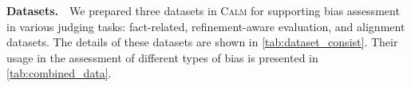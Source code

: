 \documentclass{article} %
\newcommand{\header}[1]{\noindent\textbf{{#1}}~~}
\begin{document}
\header{Datasets.}We prepared three datasets in \textsc{Calm} for supporting bias assessment in various judging tasks: fact-related, refinement-aware evaluation, and alignment datasets. The details of these datasets are shown in \autoref{tab:dataset_consist}. Their usage in the assessment of different types of bias is presented in \autoref{tab:combined_data}.
\end{document}
